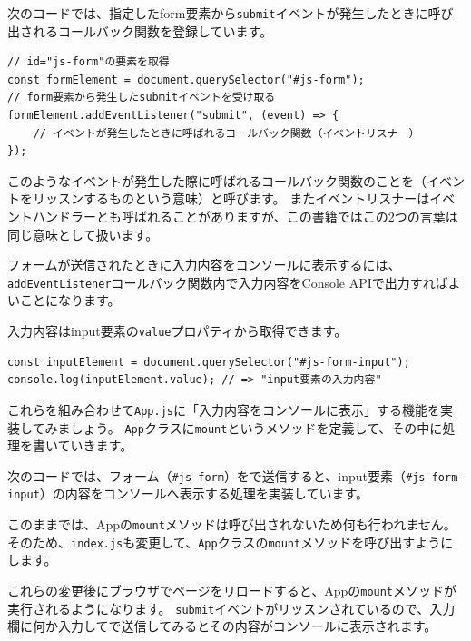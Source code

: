 次のコードでは、指定したform要素から\texttt{submit}イベントが発生したときに呼び出されるコールバック関数を登録しています。

\begin{lstlisting}
// id="js-form"の要素を取得
const formElement = document.querySelector("#js-form");
// form要素から発生したsubmitイベントを受け取る
formElement.addEventListener("submit", (event) => {
    // イベントが発生したときに呼ばれるコールバック関数（イベントリスナー）
});
\end{lstlisting}

このようなイベントが発生した際に呼ばれるコールバック関数のことを\textbf{}（イベントをリッスンするものという意味）と呼びます。
またイベントリスナーはイベントハンドラーとも呼ばれることがありますが、この書籍ではこの2つの言葉は同じ意味として扱います。

フォームが送信されたときに入力内容をコンソールに表示するには、
\texttt{addEventListener}コールバック関数内で入力内容をConsole
APIで出力すればよいことになります。

入力内容はinput要素の\texttt{value}プロパティから取得できます。

\begin{lstlisting}
const inputElement = document.querySelector("#js-form-input");
console.log(inputElement.value); // => "input要素の入力内容"
\end{lstlisting}

これらを組み合わせて\texttt{App.js}に「入力内容をコンソールに表示」する機能を実装してみましょう。
\texttt{App}クラスに\texttt{mount}というメソッドを定義して、その中に処理を書いていきます。

次のコードでは、フォーム（\texttt{\#js-form}）をで送信すると、input要素（\texttt{\#js-form-input}）の内容をコンソールへ表示する処理を実装しています。



このままでは、Appの\texttt{mount}メソッドは呼び出されないため何も行われません。
そのため、\texttt{index.js}も変更して、\texttt{App}クラスの\texttt{mount}メソッドを呼び出すようにします。



これらの変更後にブラウザでページをリロードすると、Appの\texttt{mount}メソッドが実行されるようになります。
\texttt{submit}イベントがリッスンされているので、入力欄に何か入力してで送信してみるとその内容がコンソールに表示されます。

